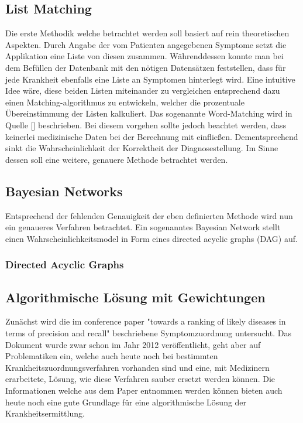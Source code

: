 \subsection{List Matching}
Die erste Methodik welche betrachtet werden soll basiert auf rein theoretischen Aspekten. Durch Angabe der vom Patienten angegebenen Symptome setzt die Applikation eine Liste von diesen zusammen. Währenddessen konnte man bei dem Befüllen der Datenbank mit den nötigen Datensätzen feststellen, dass für jede Krankheit ebenfalls eine Liste an Symptomen hinterlegt wird. Eine intuitive Idee wäre, diese beiden Listen miteinander zu vergleichen entsprechend dazu einen Matching-algorithmus zu entwickeln, welcher die prozentuale Übereinstimmung der Listen kalkuliert. Das sogenannte Word-Matching wird in Quelle [] beschrieben. Bei diesem vorgehen sollte jedoch beachtet werden, dass keinerlei medizinische Daten bei der Berechnung mit einfließen. Dementsprechend sinkt die Wahrscheinlichkeit der Korrektheit der Diagnosestellung. Im Sinne dessen soll eine weitere, genauere Methode betrachtet werden.

\subsection{Bayesian Networks}
Entsprechend der fehlenden Genauigkeit der eben definierten Methode wird nun ein genaueres Verfahren betrachtet. Ein sogenanntes Bayesian Network stellt einen Wahrscheinlichkeitsmodel in Form eines directed acyclic graphs (DAG) auf. \cite{.bahn-bonn}
\subsubsection{Directed Acyclic Graphs}

\subsection{Algorithmische Lösung mit Gewichtungen}
Zunächst wird die im conference paper "towards a ranking of likely diseases in terms of precision and recall" beschriebene Symptomzuordnung untersucht. Das Dokument wurde zwar schon im Jahr 2012 veröffentlicht, geht aber auf Problematiken ein, welche auch heute noch bei bestimmten Krankheitszuordnungsverfahren vorhanden sind und eine, mit Medizinern erarbeitete, Lösung, wie diese Verfahren sauber ersetzt werden können. Die Informationen welche aus dem Paper entnommen werden können bieten auch heute noch eine gute Grundlage für eine algorithmische Lösung der Krankheitsermittlung.

